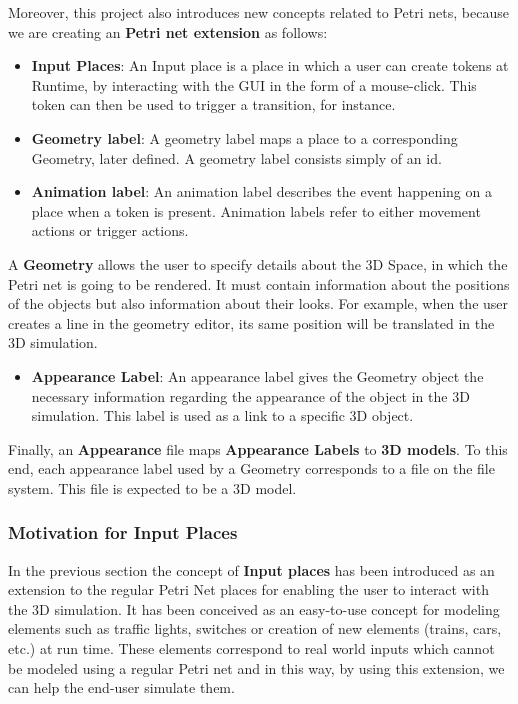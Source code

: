 Moreover, this project also introduces new concepts related to Petri nets, because we are creating an \textbf{Petri net extension} as follows:
\begin{itemize}
  \item \textbf{Input Places}: An Input place is a place in which a user can create tokens at Runtime, by interacting with the GUI in the form of a mouse-click. This token can then be used to trigger a transition, for instance.
  \item \textbf{Geometry label}: A geometry label maps a place to a corresponding Geometry, later defined.
  A geometry label consists simply of an id.

  \item \textbf{Animation label}: An animation label describes the event happening on a place when a token is present.
Animation labels refer to either movement actions or trigger actions.
\end{itemize}

A \textbf{Geometry} allows the user to specify details about the 3D Space, in which the Petri net is going to be rendered. It must contain information about the positions of the objects but also information about their looks. For example, when the user creates a line in the geometry editor, its same position will be translated in the 3D simulation.

\begin{itemize}
  \item \textbf{Appearance Label}: An appearance label gives the Geometry object the necessary information regarding the appearance of the object in the 3D simulation. This label is used as a link to a specific 3D object.
\end{itemize}

Finally, an \textbf{Appearance} file maps \textbf{Appearance Labels} to \textbf{3D models}.
To this end, each appearance label used by a Geometry corresponds to a file on the file system. This file is expected to be a 3D model.

\subsubsection{Motivation for Input Places}

In the previous section the concept of \textbf{Input places} has been introduced as an extension to the regular Petri Net places for enabling the user to interact with the 3D simulation. It has been conceived as an easy-to-use concept for modeling elements such as traffic lights, switches or creation of new elements (trains, cars, etc.) at run time. These elements correspond to real world inputs which cannot be modeled using a regular Petri net and in this way, by using this extension, we can help the end-user simulate them.

\newpage
